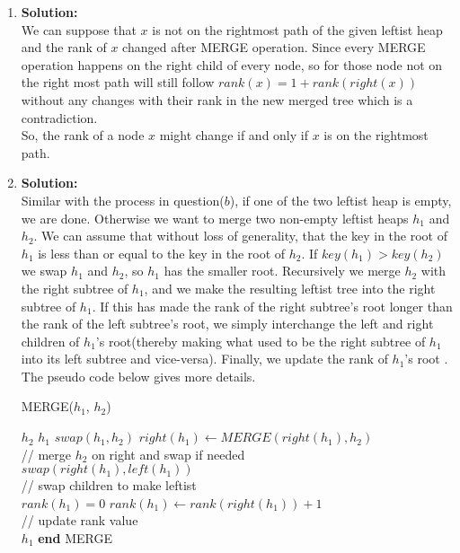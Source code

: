\begin{enumerate}[label=(\alph*)]
	\item \textbf{Solution:} \\
	We can suppose that $x$ is not on the rightmost path of the given leftist heap and the rank of $x$ changed after MERGE operation. Since every MERGE operation happens on the right child of every node, so for those node not on the right most path will still follow $rank(x) = 1 + rank(right(x))$ without any changes with their rank in the new merged tree which is a contradiction.\\

	So, the rank of a node $x$ might change if and only if $x$ is on the rightmost path.

	\item \textbf{Solution:} \\
	Similar with the process in question($b$), if one of the two leftist heap is empty, we are done. Otherwise we want to merge two non-empty leftist heaps $h_1$ and $h_2$. We can assume that without loss of generality, that the key in the root of $h_1$ is less than or equal to the key in the root of $h_2$. If $key(h_1) > key(h_2)$ we swap $h_1$ and $h_2$, so $h_1$ has the smaller root. Recursively we merge $h_2$ with the right subtree of $h_1$, and we make the resulting leftist tree into the right subtree of $h_1$. If this has made the rank of the right subtree's root longer than the rank of the left subtree's root, we simply interchange the left and right children of $h_1$'s root(thereby making what used to be the right subtree of $h_1$ into its left subtree and vice-versa). Finally, we update the rank of $h_1$'s root . The pseudo code below gives more details. 
	\begin{algorithm}
	\caption{MERGE($h_1$, $h_2$)}\label{euclid}
	\begin{algorithmic}
	 \Return $h_2$
	 \Return $h_1$
	\Else
		\State $swap(h_1, h_2)$
		\EndIf
		$right(h_1) \gets MERGE(right(h_1), h_2) $ \\
		// merge $h_2$ on right and swap if needed \\
		\State $swap(right(h_1), left(h_1))$ \\
		// swap children to make leftist \\
		\EndIf
		\State $rank(h_1) = 0$
		\Else
		\State $rank(h_1) \gets rank(right(h_1)) + 1$ \\
		// update rank value \\
		\EndIf
		\Return $h_1$
	\EndIf
	\State \textbf{end} MERGE
	\end{algorithmic}
	\end{algorithm}


\end{enumerate}
